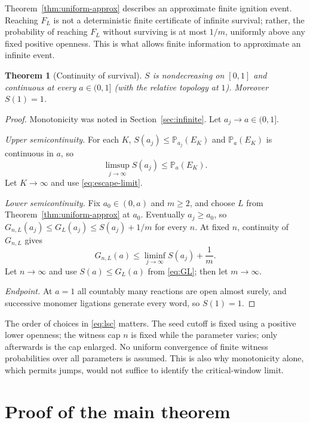 \documentclass[11pt,reqno]{amsart}
\theoremstyle{plain}
\newtheorem{theorem}{Theorem}[section]
\theoremstyle{definition}
\theoremstyle{remark}
\numberwithin{equation}{section}
\newcommand{\Prob}{\mathbb{P}}
\begin{document}
Theorem~\ref{thm:uniform-approx} describes an approximate finite ignition event. Reaching $F_L$ is not a deterministic finite certificate of infinite survival; rather, the probability of reaching $F_L$ without surviving is at most $1/m$, uniformly above any fixed positive openness. This is what allows finite information to approximate an infinite event.

\begin{theorem}[Continuity of survival]\label{thm:continuity}
$S$ is nondecreasing on $[0,1]$ and continuous at every $a\in(0,1]$ (with the relative topology at $1$). Moreover $S(1)=1$.
\end{theorem}

\begin{proof}
Monotonicity was noted in Section~\ref{sec:infinite}. Let $a_j\to a\in(0,1]$.

\emph{Upper semicontinuity.} For each $K$, $S(a_j)\le\Prob_{a_j}(E_K)$ and $\Prob_a(E_K)$ is continuous in $a$, so
\begin{equation}\label{eq:usc}
\limsup_{j\to\infty}S(a_j)\le\Prob_a(E_K).
\end{equation}
Let $K\to\infty$ and use \eqref{eq:escape-limit}.

\emph{Lower semicontinuity.} Fix $a_0\in(0,a)$ and $m\ge2$, and choose $L$ from Theorem~\ref{thm:uniform-approx} at $a_0$. Eventually $a_j\ge a_0$, so $G_{n,L}(a_j)\le G_L(a_j)\le S(a_j)+1/m$ for every $n$. At fixed $n$, continuity of $G_{n,L}$ gives
\begin{equation}\label{eq:lsc}
G_{n,L}(a)\le\liminf_{j\to\infty}S(a_j)+\frac1m .
\end{equation}
Let $n\to\infty$ and use $S(a)\le G_L(a)$ from \eqref{eq:GL}; then let $m\to\infty$.

\emph{Endpoint.} At $a=1$ all countably many reactions are open almost surely, and successive monomer ligations generate every word, so $S(1)=1$.
\end{proof}

The order of choices in \eqref{eq:lsc} matters. The seed cutoff is fixed using a positive lower openness; the witness cap $n$ is fixed while the parameter varies; only afterwards is the cap enlarged. No uniform convergence of finite witness probabilities over all parameters is assumed. This is also why monotonicity alone, which permits jumps, would not suffice to identify the critical-window limit.

\section{Proof of the main theorem}\label{sec:proof}
\end{document}
